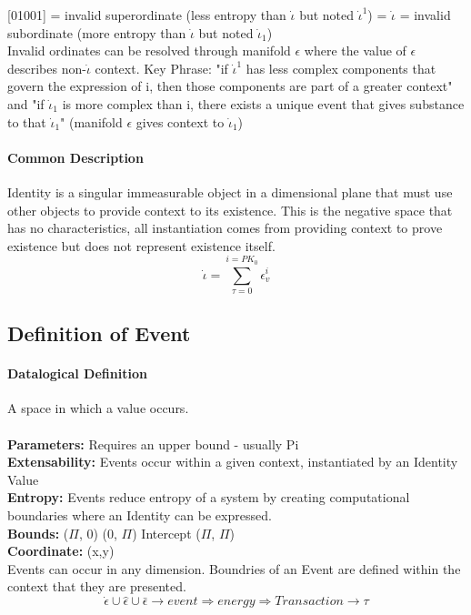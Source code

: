 \documentclass{article}
\begin{document}
			[01001] = invalid superordinate (less entropy than $\dot \iota$ but noted $\dot \iota^1$) \newline
			[01001001] = $\dot \iota$ \newline
			[010010010101] = invalid subordinate (more entropy than $\dot \iota$ but noted $\dot \iota_1$) \newline \\
				Invalid ordinates can be resolved through manifold $\epsilon$ where the value of $\epsilon$ describes non-$\dot \iota$ context.
			Key Phrase: "if $\dot \iota^1$ has less complex components that govern the expression of i, then those components are part of a greater context" and "if $\dot \iota_1$ is more complex than i, there exists a unique event that gives substance to that $\dot \iota_1$" (manifold $\epsilon$ gives context to $\dot \iota_1$)


		\paragraph {Common Description} Identity is a singular immeasurable object in a dimensional plane that must use other objects to provide context to its existence. This is the negative space that has no characteristics, all instantiation comes from providing context to prove existence but does not represent existence itself. \\

	\begin{equation}
		\dot \iota = \sum_{\tau=0}^{i=PK_0} \epsilon^i_v
	\end{equation}

\subsection{Definition of Event}
	\paragraph{Datalogical Definition}A space in which a value occurs.\\\\
		\textbf{Parameters:}  Requires an upper bound - usually Pi\\
		\textbf{Extensability:}  Events occur within a given context, instantiated by an Identity Value\\
		\textbf{Entropy:} Events reduce entropy of a system by creating computational boundaries where an Identity can be expressed. \\
		\textbf{Bounds:} ($\Pi$, 0) (0, $\Pi$) Intercept ($\Pi$, $\Pi$)  \\ 
		\textbf{Coordinate:} (x,y) \\
		Events can occur in any dimension.  Boundries of an Event are defined within the context that they are presented.
			\begin{equation}
				\dot \epsilon \cup \hat \epsilon \cup \bar \epsilon \rightarrow event \Rightarrow energy \Rightarrow Transaction \rightarrow \tau
			\end{equation}
\end{document}
